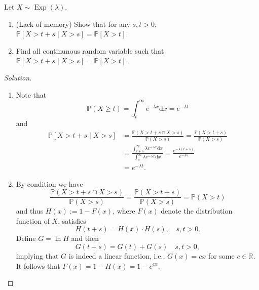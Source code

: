 \documentclass[11pt,singlecolumn, openany, citestyle=authoryear]{elegantbook}
\begin{document}
\begin{CJK}{UTF8}{gbsn}
\begin{exercise}Let $X\sim \operatorname{Exp}(\lambda)$. 
    \begin{enumerate}
        \item (Lack of memory) Show that for any $s,t>0$, $\mathbb{P}[X>t+s\mid X>s]=
        \mathbb{P}[X>t]$.
        \item Find all continunous random variable such that 
        $\mathbb{P}[X>t+s\mid X>s]=\mathbb{P}[X>t]$.
    \end{enumerate}
\end{exercise}
\begin{proof}[Solution]
    \begin{enumerate}
        \item Note that
        $$
        \mathbb{P}(X\geqslant t)=\int_t^\infty e^{-\lambda x}\mathrm{d}x = e^{-\lambda t}
        $$
        and 
        \begin{align*}
            \mathbb{P}[X>t+s\mid X>s]&=\frac{\mathbb{P}(X>t+s \cap X>s)}{\mathbb{P}(X>s)}= \frac{\mathbb{P}(X>t+s)}{\mathbb{P}(X>s)} \\
            &= \frac{\int_{t+s}^\infty \lambda e^{-\lambda x}\mathrm{d}x}{\int_{s}^\infty
            \lambda  e^{-\lambda x}\mathrm{d}x}
            = \frac{e^{-\lambda(t+s)}}{e^{-\lambda s}}\\
            &=e^{-\lambda t}. 
        \end{align*} 
        \item By condition we have
        $$
        \frac{\mathbb{P}(X>t+s \cap X>s)}{\mathbb{P}(X>s)} = 
        \frac{\mathbb{P}(X>t+s)}{\mathbb{P}(X>s)}=\mathbb{P}(X>t) 
        $$
        and thus $H(x):=1-F(x)$, where $F(x)$ denote the distribution function of $X$, satisfies
        $$
        H(t+s)=H(x)\cdot H(s), \quad s,t >0.
        $$
        Define $G=\ln H$ and then 
        $$
        G(t+s)=G(t)+G(s) \quad s,t >0,
        $$
        implying that $G$ is indeed a linear function, i.e., $G(x)=cx$ for some $c\in\mathbb{R}$.
        It follows that $F(x)=1-H(x)=1-e^{cx}$.
    \end{enumerate}
\end{proof}


\end{CJK}
\end{document}
